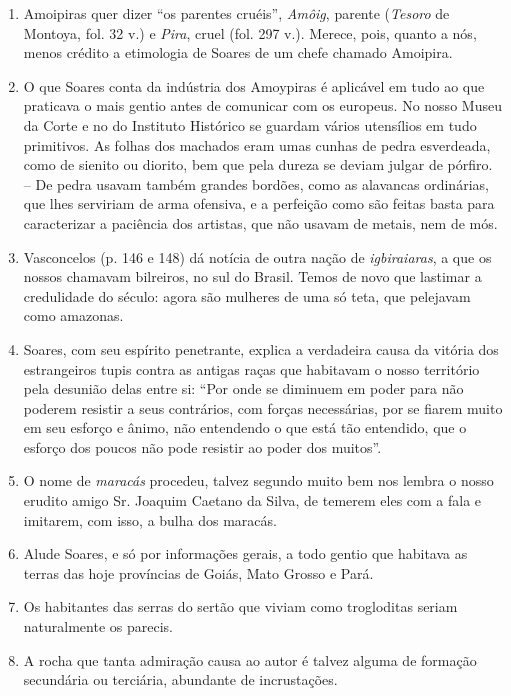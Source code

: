 \begin{enumerate}
\item Amoipiras quer dizer ``os parentes cruéis'', \textit{Amôig}, parente (\textit{Tesoro} de 
Montoya, fol. 32 v.) e \textit{Pira}, cruel (fol. 297 v.). Merece, pois, quanto a nós, menos 
crédito a etimologia de Soares de um chefe chamado Amoipira.

\item O que Soares conta da indústria dos Amoypiras é aplicável em tudo ao que praticava 
o mais gentio antes de comunicar com os europeus.
No nosso Museu da Corte e no do Instituto Histórico se guardam vários utensílios em 
tudo primitivos. As folhas dos machados eram umas cunhas de pedra esverdeada, como de 
sienito ou diorito, bem que pela dureza se deviam julgar de pórfiro. -- De pedra usavam 
também grandes bordões, como as alavancas ordinárias, que lhes serviriam de arma 
ofensiva, e a perfeição como são feitas basta para caracterizar a paciência dos artistas, que 
não usavam de metais, nem de mós.

\item  Vasconcelos (p. 146 e 148) dá notícia de outra nação de \textit{igbiraiaras},
a que os nossos chamavam bilreiros, no sul do Brasil.
Temos de novo que lastimar a credulidade do século: agora são mulheres de uma só 
teta, que pelejavam como amazonas.

\item Soares, com seu espírito penetrante, explica a verdadeira causa da vitória dos 
estrangeiros tupis contra as antigas raças que habitavam o nosso território pela desunião 
delas entre si: ``Por onde se diminuem em poder para não poderem resistir a seus 
contrários, com forças necessárias, por se fiarem muito em seu esforço e ânimo, não 
entendendo o que está tão entendido, que o esforço dos poucos não pode resistir ao 
poder dos muitos''. 

\item O nome de \textit{maracás} procedeu, talvez segundo muito bem nos lembra o nosso 
erudito amigo Sr. Joaquim Caetano da Silva, de temerem eles com a fala e imitarem, 
com isso, a bulha dos maracás.

\item Alude Soares, e só por informações gerais, a todo gentio que habitava  as terras 
das hoje províncias de Goiás, Mato Grosso e Pará.

\item Os habitantes das serras do sertão que viviam como trogloditas seriam 
naturalmente os parecis.

\item A rocha que tanta admiração causa ao autor é talvez alguma de formação 
secundária ou terciária, abundante de incrustações.


\end{enumerate}
